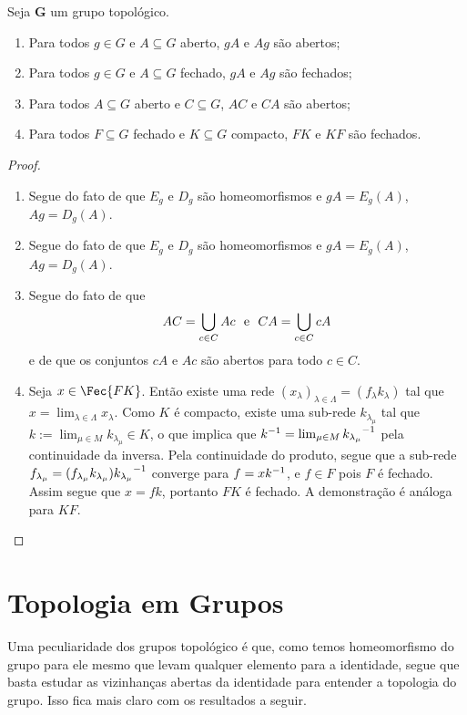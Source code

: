 \begin{prop}
Seja $\bm G$ um grupo topológico.
	\begin{enumerate}
	\item Para todos $g \in G$ e $A \subseteq G$ aberto, $gA$ e $Ag$ são abertos;
	\item Para todos $g \in G$ e $A \subseteq G$ fechado, $gA$ e $Ag$ são fechados;
	\item Para todos $A \subseteq G$ aberto e $C \subseteq G$, $AC$ e $CA$ são abertos;
	\item Para todos $F \subseteq G$ fechado e $K \subseteq G$ compacto, $FK$ e $KF$ são fechados.
	\end{enumerate}
\end{prop}
\begin{proof}
	\begin{enumerate}
	\item Segue do fato de que $E_g$ e $D_g$ são homeomorfismos e $gA = E_g(A)$, $Ag = D_g(A)$.
	\item Segue do fato de que $E_g$ e $D_g$ são homeomorfismos e $gA = E_g(A)$, $Ag = D_g(A)$.
	\item Segue do fato de que
		\begin{equation*}
		AC = \bigcup_{c \in C} Ac \text{\ \ e\ \ } CA = \bigcup_{c \in C} cA
		\end{equation*}
e de que os conjuntos $cA$ e $Ac$ são abertos para todo $c \in C$.
	\item Seja $x \in \Fec{FK}$. Então existe uma rede $(x_\lambda)_{\lambda \in \Lambda} = (f_\lambda k_\lambda)$ tal que $x = \lim_{\lambda \in \Lambda} x_\lambda$. Como $K$ é compacto, existe uma sub-rede $k_{\lambda_\mu}$ tal que $k := \lim_{\mu \in M} k_{\lambda_\mu} \in K$, o que implica que $k^{-1} = \lim_{\mu \in M} {k_{\lambda_\mu}}^{-1}$ pela continuidade da inversa. Pela continuidade do produto, segue que a sub-rede $f_{\lambda_\mu} = (f_{\lambda_\mu}k_{\lambda_\mu}){k_{\lambda_\mu}}^{-1}$ converge para $f = xk^{-1}$, e $f \in F$ pois $F$ é fechado. Assim segue que $x=fk$, portanto $FK$ é fechado. A demonstração é análoga para $KF$.
	\end{enumerate}
\end{proof}

\section{Topologia em Grupos}

Uma peculiaridade dos grupos topológico é que, como temos homeomorfismo do grupo para ele mesmo que levam qualquer elemento para a identidade, segue que basta estudar as vizinhanças abertas da identidade para entender a topologia do grupo. Isso fica mais claro com os resultados a seguir.

